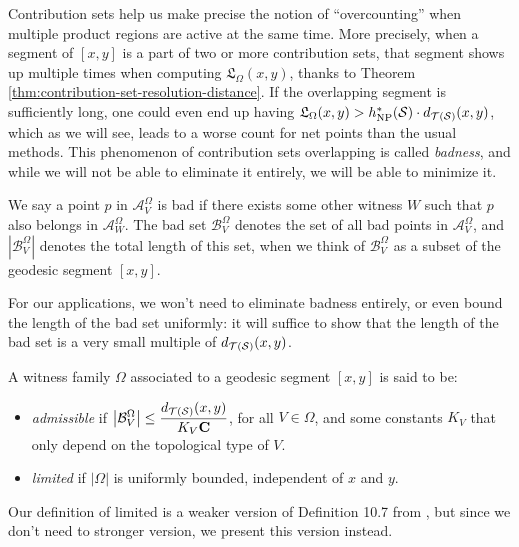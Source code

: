 \documentclass[12pt, reqno]{amsart}
\begin{document}
Contribution sets help us make precise the notion of ``overcounting'' when multiple product regions are active at the same time.
More precisely, when a segment of $[x,y]$ is a part of two or more contribution sets, that segment shows up multiple times when computing $\mathfrak{L}_{\Omega}(x,y)$, thanks to Theorem \ref{thm:contribution-set-resolution-distance}.
If the overlapping segment is sufficiently long, one could even end up having $\mathfrak{L}_{\Omega}(x,y) > h_{\mathrm{NP}}^\ast(\mathcal{S}) \cdot d_{\mathcal{T}(\mathcal{S})}(x, y)$, which as we will see, leads to a worse count for net points than the usual methods.
This phenomenon of contribution sets overlapping is called \emph{badness}, and while we will not be able to eliminate it entirely, we will be able to minimize it.

\begin{definition}
  We say a point $p$ in $\mathcal{A}_V^{\Omega}$ is bad if there exists some other witness $W$ such that $p$ also belongs in $\mathcal{A}_W^{\Omega}$.
  The bad set $\mathcal{B}_V^{\Omega}$ denotes the set of all bad points in $\mathcal{A}_V^{\Omega}$, and $\left| \mathcal{B}_V^{\Omega} \right|$ denotes the total length of this set, when we think of $\mathcal{B}_V^{\Omega}$ as a subset of the geodesic segment $[x,y]$.
\end{definition}

For our applications, we won't need to eliminate badness entirely, or even bound the length of the bad set uniformly: it will suffice to show that the length of the bad set is a very small multiple of $d_{\mathcal{T}(\mathcal{S})}(x,y)$.

\begin{definition}
  A witness family $\Omega$ associated to a geodesic segment $[x,y]$ is said to be:
  \begin{itemize}
  \item \emph{admissible} if $\displaystyle \left| \mathcal{B}_V^{\Omega} \right| \leq \frac{d_{\mathcal{T}(\mathcal{S})}(x,y)}{K_V \mathbf{C}}$, for all $V \in \Omega$, and some constants $K_V$ that only depend on the topological type of $V$.
  \item \emph{limited} if $\left| \Omega \right|$ is uniformly bounded, independent of $x$ and $y$.
  \end{itemize}
\end{definition}
\begin{rem}
  Our definition of limited is a weaker version of Definition 10.7 from \textcite{dowdall2023lattice}, but since we don't need to stronger version, we present this version instead.
\end{rem}
\end{document}
